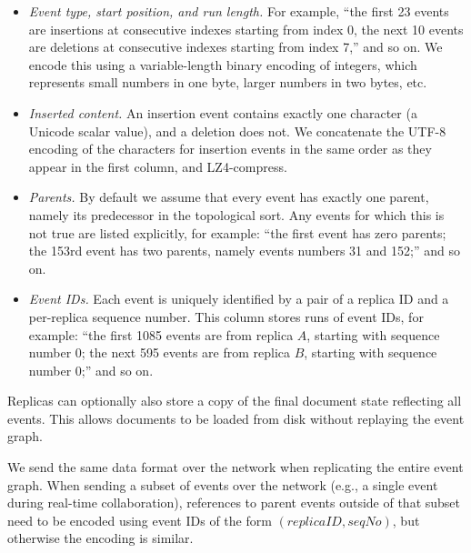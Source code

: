 \documentclass[sigplan,10pt]{acmart}
\begin{document}
\begin{itemize}
\item \emph{Event type, start position, and run length.} For example, ``the first 23 events are insertions at consecutive indexes starting from index 0, the next 10 events are deletions at consecutive indexes starting from index 7,'' and so on. We encode this using a variable-length binary encoding of integers, which represents small numbers in one byte, larger numbers in two bytes, etc.
\item \emph{Inserted content.} An insertion event contains exactly one character (a Unicode scalar value), and a deletion does not. We concatenate the UTF-8 encoding of the characters for insertion events in the same order as they appear in the first column, and LZ4-compress.
\item \emph{Parents.} By default we assume that every event has exactly one parent, namely its predecessor in the topological sort. Any events for which this is not true are listed explicitly, for example: ``the first event has zero parents; the 153rd event has two parents, namely events numbers 31 and 152;'' and so on.
\item \emph{Event IDs.} Each event is uniquely identified by a pair of a replica ID and a per-replica sequence number. This column stores runs of event IDs, for example: ``the first 1085 events are from replica $A$, starting with sequence number 0; the next 595 events are from replica $B$, starting with sequence number 0;'' and so on.
\end{itemize}


Replicas can optionally also store a copy of the final document state reflecting all events. This allows documents to be loaded from disk without replaying the event graph.

We send the same data format over the network when replicating the entire event graph.
When sending a subset of events over the network (e.g., a single event during real-time collaboration), references to parent events outside of that subset need to be encoded using event IDs of the form $(\mathit{replicaID}, \mathit{seqNo})$, but otherwise the encoding is similar.
\end{document}
